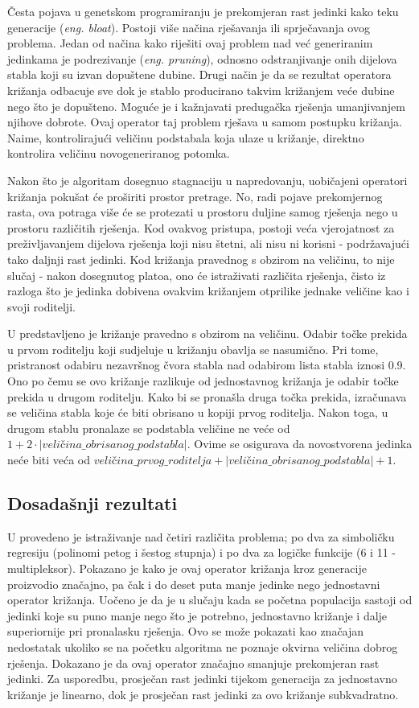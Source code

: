 Česta pojava u genetskom programiranju je prekomjeran rast jedinki kako teku generacije (\textit{eng. bloat}). Postoji više načina rješavanja ili sprječavanja ovog problema. Jedan od načina kako riješiti ovaj problem nad već generiranim jedinkama je podrezivanje (\textit{eng. pruning}), odnosno odstranjivanje onih dijelova stabla koji su izvan dopuštene dubine. Drugi način je da se rezultat operatora križanja odbacuje sve dok je stablo producirano takvim križanjem veće dubine nego što je dopušteno. Moguće je i kažnjavati predugačka rješenja umanjivanjem njihove dobrote. Ovaj operator taj problem rješava u samom postupku križanja. Naime, kontrolirajući veličinu podstabala koja ulaze u križanje, direktno kontrolira veličinu novogeneriranog potomka.

Nakon što je algoritam dosegnuo stagnaciju u napredovanju, uobičajeni operatori križanja pokušat će proširiti prostor pretrage. No, radi pojave prekomjernog rasta, ova potraga više će se protezati u prostoru duljine samog rješenja nego u prostoru različitih rješenja. Kod ovakvog pristupa, postoji veća vjerojatnost za preživljavanjem dijelova rješenja koji nisu štetni, ali nisu ni korisni - podržavajući tako daljnji rast jedinki. Kod križanja pravednog s obzirom na veličinu, to nije slučaj - nakon dosegnutog platoa, ono će istraživati različita rješenja, čisto iz razloga što je jedinka dobivena ovakvim križanjem otprilike jednake veličine kao i svoji roditelji.

U \cite{crxSizeFair} predstavljeno je križanje pravedno s obzirom na veličinu. Odabir točke prekida u prvom roditelju koji sudjeluje u križanju obavlja se nasumično. Pri tome, pristranost odabiru nezavršnog čvora stabla nad odabirom lista stabla iznosi 0.9. Ono po čemu se ovo križanje razlikuje od jednostavnog križanja je odabir točke prekida u drugom roditelju. Kako bi se pronašla druga točka prekida, izračunava se veličina stabla koje će biti obrisano u kopiji prvog roditelja. Nakon toga, u drugom stablu pronalaze se podstabla veličine ne veće od $1+2 \cdot |veličina\_obrisanog\_podstabla|$. Ovime se osigurava da novostvorena jedinka neće biti veća od $veličina\_prvog\_roditelja + |veličina\_obrisanog\_podstabla| + 1$.



\subsection{Dosadašnji rezultati}
U \cite{crxSizeFair}  provedeno je istraživanje nad četiri različita problema; po dva za simboličku regresiju (polinomi petog i šestog stupnja) i po dva za logičke funkcije (6 i 11 - multipleksor). Pokazano je kako je ovaj operator križanja kroz generacije proizvodio značajno, pa čak i do deset puta manje jedinke nego jednostavni operator križanja. Uočeno je da je u slučaju kada se početna populacija sastoji od jedinki koje su puno manje nego što je potrebno, jednostavno križanje i dalje superiornije pri pronalasku rješenja. Ovo se može pokazati kao značajan nedostatak ukoliko se na početku algoritma ne poznaje okvirna veličina dobrog rješenja. Dokazano je da ovaj operator značajno smanjuje prekomjeran rast jedinki. Za usporedbu, prosječan rast jedinki tijekom generacija za jednostavno križanje je linearno, dok je prosječan rast jedinki za ovo križanje subkvadratno.